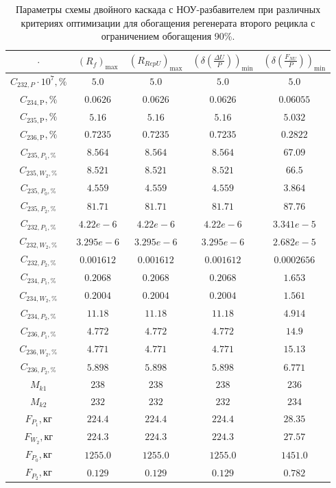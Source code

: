 \begin{table}
    \centering
    \begin{tabular}{|c|cccc|}
        \hline $\cdot$ & $(R_f)_\text{max}$ & $(R_{RepU})_\text{max}$ & $(\delta(\frac{\Delta U}{P}))_\text{min}$ & $(\delta(\frac{F_{NU}}{P}))_\text{min}$\\ \hline
    $C_{232,P}\cdot10^{7}, \%$ & $5.0$ & $5.0$ & $5.0$ & $5.0$\\ \hline
    $C_{234,\text{P}}, \%$ & $0.0626$ & $0.0626$ & $0.0626$ & $0.06055$\\ \hline
    $C_{235,\text{P}}, \%$ & $5.16$ & $5.16$ & $5.16$ & $5.032$\\ \hline
    $C_{236,\text{P}}, \%$ & $0.7235$ & $0.7235$ & $0.7235$ & $0.2822$\\ \hline
    $C_{235,P_1, \%}$ & $8.564$ & $8.564$ & $8.564$ & $67.09$\\ \hline
    $C_{235,W_2, \%}$ & $8.521$ & $8.521$ & $8.521$ & $66.5$\\ \hline
    $C_{235,P_0, \%}$ & $4.559$ & $4.559$ & $4.559$ & $3.864$\\ \hline
    $C_{235,P_2, \%}$ & $81.71$ & $81.71$ & $81.71$ & $87.76$\\ \hline
    $C_{232,P_1, \%}$ & $4.22e-6$ & $4.22e-6$ & $4.22e-6$ & $3.341e-5$\\ \hline
    $C_{232,W_2, \%}$ & $3.295e-6$ & $3.295e-6$ & $3.295e-6$ & $2.682e-5$\\ \hline
    $C_{232,P_2, \%}$  & $0.001612$ & $0.001612$ & $0.001612$ & $0.0002656$\\ \hline
    $C_{234,P_1, \%}$ & $0.2068$ & $0.2068$ & $0.2068$ & $1.653$\\ \hline 
    $C_{234,W_2, \%}$ & $0.2004$ & $0.2004$ & $0.2004$ & $1.561$\\ \hline
    $C_{234,P_2, \%}$ & $11.18$ & $11.18$ & $11.18$ & $4.914$\\ \hline
    $C_{236,P_1, \%}$ & $4.772$ & $4.772$ & $4.772$ & $14.9$\\ \hline
    $C_{236,W_2, \%}$ & $4.771$ & $4.771$ & $4.771$ & $15.13$\\ \hline
    $C_{236,P_2, \%}$ & $5.898$ & $5.898$ & $5.898$ & $6.771$\\ \hline

    $M_{k1}$ & $238$ & $238$ & $238$ & $236$\\ \hline
    $M_{k2}$ & $232$ & $232$ & $232$ & $234$\\ \hline
    $F_{P_1}, \text{кг}$ & $224.4$ & $224.4$ & $224.4$ & $28.35$\\ \hline
    $F_{W_2}, \text{кг}$ & $224.3$ & $224.3$ & $224.3$ & $27.57$\\ \hline
    $F_{P_0}, \text{кг}$ & $1255.0$ & $1255.0$ & $1255.0$ & $1451.0$\\ \hline
    $F_{P_2}, \text{кг}$ & $0.129$ & $0.129$ & $0.129$ & $0.782$\\ \hline
\end{tabular}
\caption{Параметры схемы двойного каскада с НОУ-разбавителем при различных критериях оптимизации для обогащения регенерата второго рецикла с ограничением обогащения 90\%.{\label{2opt2_90}}}
\end{table}

